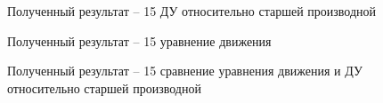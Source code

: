 \documentclass[12pt]{article}
\begin{document}
	\begin{figure}[h]
	\caption{Полученный результат -- 15 ДУ относительно старшей производной}
\end{figure}

\begin{figure}[h]
	\caption{Полученный результат --  15 уравнение движения}
\end{figure}

\begin{figure}[h]
	\caption{Полученный результат --  15 сравнение уравнения движения и ДУ относительно старшей производной}
\end{figure}
\end{document}
